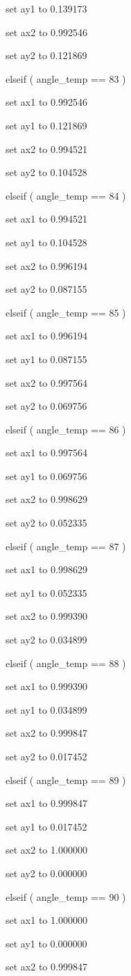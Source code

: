 \documentclass[
]{article}
\begin{document}
set ay1 to 0.139173

set ax2 to 0.992546

set ay2 to 0.121869

elseif ( angle\_temp == 83 )

set ax1 to 0.992546

set ay1 to 0.121869

set ax2 to 0.994521

set ay2 to 0.104528

elseif ( angle\_temp == 84 )

set ax1 to 0.994521

set ay1 to 0.104528

set ax2 to 0.996194

set ay2 to 0.087155

elseif ( angle\_temp == 85 )

set ax1 to 0.996194

set ay1 to 0.087155

set ax2 to 0.997564

set ay2 to 0.069756

elseif ( angle\_temp == 86 )

set ax1 to 0.997564

set ay1 to 0.069756

set ax2 to 0.998629

set ay2 to 0.052335

elseif ( angle\_temp == 87 )

set ax1 to 0.998629

set ay1 to 0.052335

set ax2 to 0.999390

set ay2 to 0.034899

elseif ( angle\_temp == 88 )

set ax1 to 0.999390

set ay1 to 0.034899

set ax2 to 0.999847

set ay2 to 0.017452

elseif ( angle\_temp == 89 )

set ax1 to 0.999847

set ay1 to 0.017452

set ax2 to 1.000000

set ay2 to 0.000000

elseif ( angle\_temp == 90 )

set ax1 to 1.000000

set ay1 to 0.000000

set ax2 to 0.999847
\end{document}
